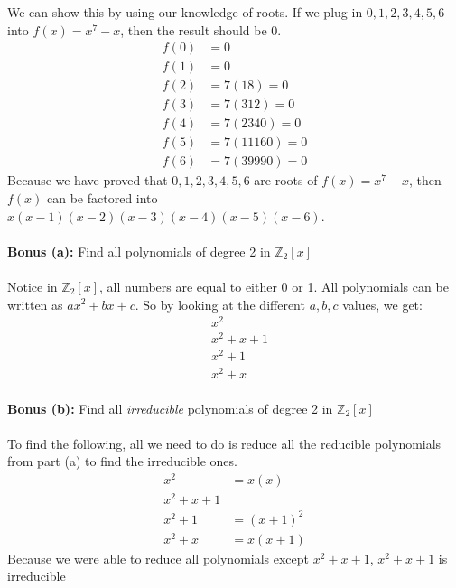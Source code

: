 \documentclass[12pt]{article}
\begin{document}
\noindent We can show this by using our knowledge of roots.  If we plug in $0,1,2,3,4,5,6$ into $f(x) = x^7 - x$, then the result should be 0.
	\begin{align*}
		f(0) &= 0 \\
		f(1) &= 0 \\
		f(2) &= 7(18) = 0 \\
		f(3) &= 7(312) = 0 \\
		f(4) &= 7(2340) = 0 \\
		f(5) &= 7(11160) = 0 \\
		f(6) &= 7(39990) = 0
	\end{align*}
Because we have proved that $0,1,2,3,4,5,6$ are roots of $f(x) = x^7 - x$, then $f(x)$ can be factored into $x(x - 1)(x - 2)(x - 3)(x - 4)(x - 5)(x - 6)$.
\\ \\

\noindent \textbf{Bonus (a): }Find all polynomials of degree 2 in $\mathbb{Z}_2[x]$
\\ \\

\noindent Notice in $\mathbb{Z}_2[x]$, all numbers are equal to either 0 or 1. All polynomials can be written as $ax^2 + bx + c$.  So by looking at the different $a,b,c$ values, we get:
	\begin{align*}
		&x^2 \\
		&x^2 + x + 1 \\
		&x^2 + 1 \\
		&x^2 + x \\
	\end{align*}

\noindent \textbf{Bonus (b): }Find all \textit{irreducible} polynomials of degree 2 in $\mathbb{Z}_2[x]$
\\ \\

\noindent To find the following, all we need to do is reduce all the reducible polynomials from part (a) to find the irreducible ones.
	\begin{align*}
		x^2 &= x(x) \\
		x^2 + x + 1 & \\
		x^2 + 1 &= (x + 1)^2  \\
		x^2 + x &= x(x+1) 
	\end{align*}
Because we were able to reduce all polynomials except $x^2 + x + 1$, $x^2 + x + 1$ is irreducible	
\end{document}
